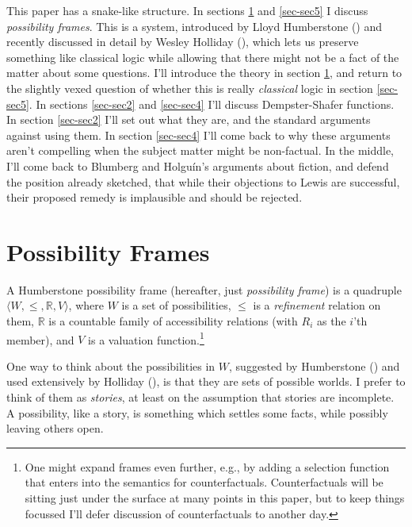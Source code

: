 \documentclass[
  11pt,
  letterpaper,
  DIV=11,
  numbers=noendperiod,
  twoside]{scrartcl}
\begin{document}
This paper has a snake-like structure. In sections \ref{sec-sec1} and
\ref{sec-sec5} I discuss \emph{possibility frames}. This is a system,
introduced by Lloyd Humberstone ()
and recently discussed in detail by Wesley Holliday
(), which lets us preserve something
like classical logic while allowing that there might not be a fact of
the matter about some questions. I'll introduce the theory in section
\ref{sec-sec1}, and return to the slightly vexed question of whether
this is really \emph{classical} logic in section \ref{sec-sec5}. In
sections \ref{sec-sec2} and \ref{sec-sec4} I'll discuss Dempster-Shafer
functions. In section \ref{sec-sec2} I'll set out what they are, and the
standard arguments against using them. In section \ref{sec-sec4} I'll
come back to why these arguments aren't compelling when the subject
matter might be non-factual. In the middle, I'll come back to Blumberg
and Holguín's arguments about fiction, and defend the position already
sketched, that while their objections to Lewis are successful, their
proposed remedy is implausible and should be rejected.

\section{Possibility Frames}\label{sec-sec1}

A Humberstone possibility frame (hereafter, just \emph{possibility
frame}) is a quadruple \(\langle W, {\leqslant}, \mathbb{R}, V\rangle\),
where \(W\) is a set of possibilities, \(\leqslant\) is a
\emph{refinement} relation on them, \(\mathbb{R}\) is a countable family
of accessibility relations (with \(R_i\) as the \(i\)'th member), and
\(V\) is a valuation function.\footnote{One might expand frames even
  further, e.g., by adding a selection function that enters into the
  semantics for counterfactuals. Counterfactuals will be sitting just
  under the surface at many points in this paper, but to keep things
  focussed I'll defer discussion of counterfactuals to another day.}

One way to think about the possibilities in \(W\), suggested by
Humberstone () and used extensively
by Holliday (), is that they are sets
of possible worlds. I prefer to think of them as \emph{stories}, at
least on the assumption that stories are incomplete. A possibility, like
a story, is something which settles some facts, while possibly leaving
others open.
\end{document}
